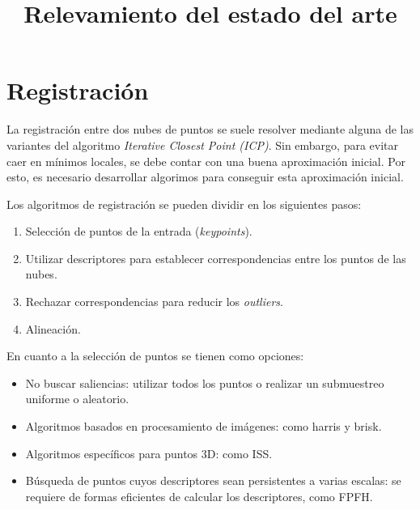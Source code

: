 \documentclass{pfc}
\title{Relevamiento del estado del arte}
\begin{document}
	\maketitle


	\section{Registración}
		La registración entre dos nubes de puntos se suele resolver mediante
		alguna de las variantes del algoritmo \emph{Iterative Closest Point (ICP)}. 
		Sin embargo, para evitar caer en mínimos locales,
		se debe contar con una buena aproximación inicial.
		Por esto, es necesario desarrollar algorimos para conseguir esta
		aproximación inicial.\cite{7271006}



		Los algoritmos de registración se pueden dividir en los siguientes pasos:\cite{conf/3dim/RusinkiewiczL01}
		\begin{enumerate}
			\item Selección de puntos de la entrada (\emph{keypoints}).
			\item Utilizar descriptores para establecer correspondencias entre los puntos de las nubes.
			\item Rechazar correspondencias para reducir los \emph{outliers}.
			\item Alineación.
		\end{enumerate}

		En cuanto a la selección de puntos se tienen como opciones:
		\begin{itemize}
			\item No buscar saliencias: utilizar todos los puntos o realizar un submuestreo uniforme o aleatorio.
			\item Algoritmos basados en procesamiento de imágenes: como harris y brisk.
			\item Algoritmos específicos para puntos 3D: como ISS.
			\item Búsqueda de puntos cuyos descriptores sean persistentes a varias escalas: se requiere de formas eficientes de calcular los descriptores, como FPFH.
		\end{itemize}
\end{document}
